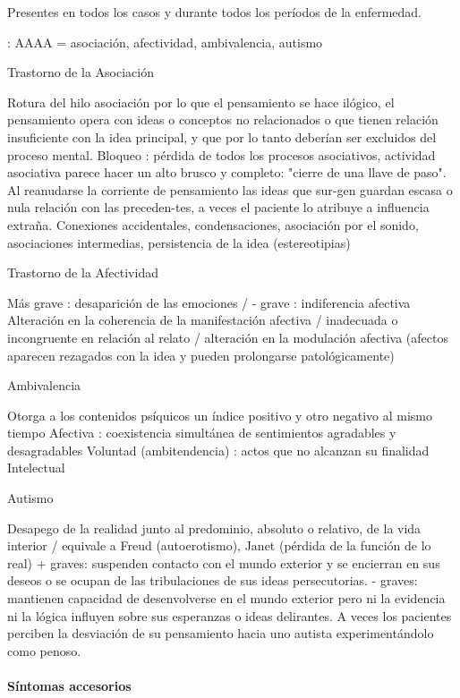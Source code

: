 Presentes en todos los casos y durante todos los períodos de la enfermedad.

\faLightbulb: AAAA = asociación, afectividad, ambivalencia, autismo

Trastorno de la Asociación

Rotura del hilo asociación por lo que el pensamiento se hace ilógico, el pensamiento opera con ideas o conceptos no relacionados o que tienen relación insuficiente con la idea principal, y que por lo tanto deberían ser excluidos del proceso mental. Bloqueo : pérdida de todos los procesos asociativos, actividad asociativa parece hacer un alto brusco y completo: "cierre de una llave de paso". Al reanudarse la corriente de pensamiento las ideas que sur-gen guardan escasa o nula relación con las preceden-tes, a veces el paciente lo atribuye a influencia extraña. Conexiones accidentales, condensaciones, asociación por el sonido, asociaciones intermedias, persistencia de la idea (estereotipias)

Trastorno de la Afectividad

Más grave : desaparición de las emociones / - grave : indiferencia afectiva Alteración en la coherencia de la manifestación afectiva / inadecuada o incongruente en relación al relato / alteración en la modulación afectiva (afectos aparecen rezagados con la idea y pueden prolongarse patológicamente)

Ambivalencia

Otorga a los contenidos psíquicos un índice positivo y otro negativo al mismo tiempo Afectiva : coexistencia simultánea de sentimientos agradables y desagradables Voluntad (ambitendencia) : actos que no alcanzan su finalidad Intelectual

Autismo

Desapego de la realidad junto al predominio, absoluto o relativo, de la vida interior / equivale a Freud (autoerotismo), Janet (pérdida de la función de lo real) + graves: suspenden contacto con el mundo exterior y se encierran en sus deseos o se ocupan de las tribulaciones de sus ideas persecutorias. - graves: mantienen capacidad de desenvolverse en el mundo exterior pero ni la evidencia ni la lógica influyen sobre sus esperanzas o ideas delirantes. A veces los pacientes perciben la desviación de su pensamiento hacia uno autista experimentándolo como penoso.

\paragraph*{Síntomas accesorios}

